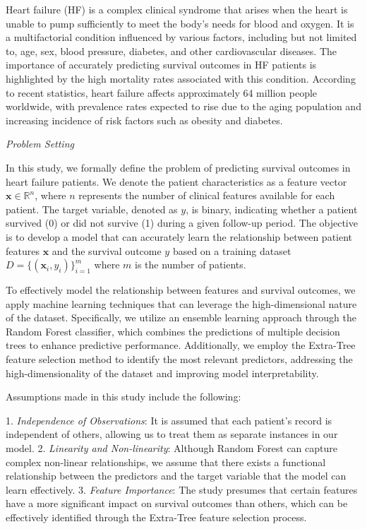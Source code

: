 \documentclass{article}
\begin{document}
Heart failure (HF) is a complex clinical syndrome that arises when the heart is unable to pump sufficiently to meet the body's needs for blood and oxygen. It is a multifactorial condition influenced by various factors, including but not limited to, age, sex, blood pressure, diabetes, and other cardiovascular diseases. The importance of accurately predicting survival outcomes in HF patients is highlighted by the high mortality rates associated with this condition. According to recent statistics, heart failure affects approximately 64 million people worldwide, with prevalence rates expected to rise due to the aging population and increasing incidence of risk factors such as obesity and diabetes.

\textit{Problem Setting}

In this study, we formally define the problem of predicting survival outcomes in heart failure patients. We denote the patient characteristics as a feature vector \( \mathbf{x} \in \mathbb{R}^n \), where \( n \) represents the number of clinical features available for each patient. The target variable, denoted as \( y \), is binary, indicating whether a patient survived (0) or did not survive (1) during a given follow-up period. The objective is to develop a model that can accurately learn the relationship between patient features \( \mathbf{x} \) and the survival outcome \( y \) based on a training dataset \( D = \{(\mathbf{x}_i, y_i)\}_{i=1}^m \) where \( m \) is the number of patients.

To effectively model the relationship between features and survival outcomes, we apply machine learning techniques that can leverage the high-dimensional nature of the dataset. Specifically, we utilize an ensemble learning approach through the Random Forest classifier, which combines the predictions of multiple decision trees to enhance predictive performance. Additionally, we employ the Extra-Tree feature selection method to identify the most relevant predictors, addressing the high-dimensionality of the dataset and improving model interpretability.

Assumptions made in this study include the following:

1. \textit{Independence of Observations}: It is assumed that each patient's record is independent of others, allowing us to treat them as separate instances in our model.
2. \textit{Linearity and Non-linearity}: Although Random Forest can capture complex non-linear relationships, we assume that there exists a functional relationship between the predictors and the target variable that the model can learn effectively.
3. \textit{Feature Importance}: The study presumes that certain features have a more significant impact on survival outcomes than others, which can be effectively identified through the Extra-Tree feature selection process.
\end{document}
